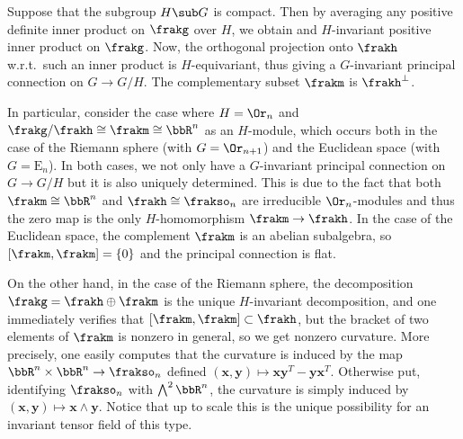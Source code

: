 \begin{example}
    Suppose that the subgroup $H\sub G$ is compact. Then by averaging any positive definite inner product on $\frakg$ over $H$, we obtain and $H$-invariant positive inner product on $\frakg$. Now, the orthogonal projection onto $\frakh$ w.r.t.\ such an inner product is $H$-equivariant, thus giving a $G$-invariant principal connection on $G\to G\slash H$. The complementary subset $\frakm$ is $\frakh^\perp$.

    In particular, consider the case where $H=\Or_n$ and $\frakg\slash\frakh\cong \frakm\cong \bbR^n$ as an $H$-module, which occurs both in the case of the Riemann sphere (with $G=\Or_{n+1}$) and the Euclidean space (with $G=\mathrm{E}_n$). In both cases, we not only have a $G$-invariant principal connection on $G\to G\slash H$ but it is also uniquely determined. This is due to the fact that both $\frakm\cong\bbR^n$ and $\frakh\cong \frakso_n$ are irreducible $\Or_n$-modules and thus the zero map is the only $H$-homomorphism $\frakm\to \frakh$. In the case of the Euclidean space, the complement $\frakm$ is an abelian subalgebra, so $[\frakm,\frakm]=\{0\}$ and the principal connection is flat.

    On the other hand, in the case of the Riemann sphere, the decomposition $\frakg=\frakh\oplus\frakm$ is the unique $H$-invariant decomposition, and one immediately verifies that $[\frakm,\frakm]\subset\frakh$, but the bracket of two elements of $\frakm$ is nonzero in general, so we get nonzero curvature. More precisely, one easily computes that the curvature is induced by the map $\bbR^n\times\bbR^n\to \frakso_n$ defined $(\bm{x},\bm{y})\mapsto \bm{x}\bm{y}^T-\bm{y}\bm{x}^T$. Otherwise put, identifying $\frakso_n$ with $\bigwedge^2\bbR^n$, the curvature is simply induced by $(\bm{x},\bm{y})\mapsto \bm{x}\wedge \bm{y}$. Notice that up to scale this is the unique possibility for an invariant tensor field of this type.
 \end{example}

